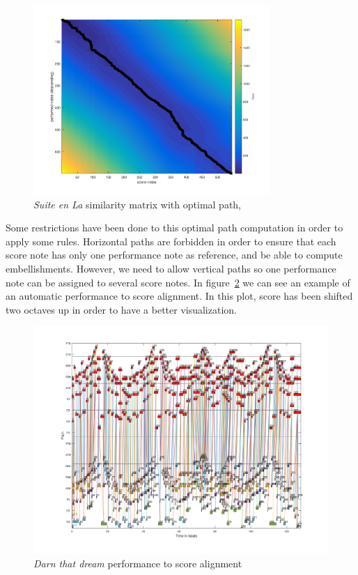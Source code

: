 \begin{figure}[ht!]
\caption{\textit{Suite en La} similarity matrix with optimal path,}
\label{fig:suite_cost_matrix}
\centering
\includegraphics[width=0.8\textwidth]{Figures/Suite_en_la_cost.pdf}
\end{figure}

Some restrictions have been done to this optimal path computation in order to apply some rules. Horizontal paths are forbidden in order to ensure that each score note has only one performance note as reference, and be able to compute embellishments. However, we need to allow vertical paths so one performance note can be assigned to several score notes. In figure~\ref{fig:darn_auto_alignment} we can see an example of an automatic performance to score alignment. In this plot, score has been shifted two octaves up in order to have a better visualization.

\begin{figure}[ht!]
\caption{\textit{Darn that dream} performance to score alignment}
\label{fig:darn_auto_alignment}
\centering
\includegraphics[width=\textwidth]{Figures/Darn_that_dream_auto.pdf}
\end{figure}


